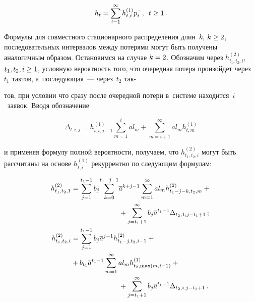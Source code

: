 \begin{multicols}{2}
\noindent
\begin{equation}
\label{loss4}
h_{t}
=\sum\limits_{i=1}^{\infty} h^{(1)}_{t,i} p_i^-, \enskip t \ge 1\,.
\end{equation}

\vspace*{-2pt}

\noindent Формулы для совместного стационарного распределения длин~$k$, 
$k\hm\ge2$, последовательных
интервалов между потерями могут быть получены аналогичным образом. 
Остановимся на случае $k\hm=2$. Обозначим через $h^{(2)}_{t_1,t_2,i}$, 
$t_1,t_2,i \hm\ge 1$, условную вероятность того, что
очередная потеря произойдет через~$t_1$ тактов, а~последующая~--- 
через~$t_2$ так-\linebreak\vspace*{-12pt}

\columnbreak

\noindent
тов, при условии что сразу после очередной потери 
в~сис\-те\-ме находится~$i$~заявок. Вводя обозначение

\vspace*{2pt}

\noindent
$$
\Delta_{t,i,j}=
h^{(1)}_{t,i,j-1} \sum\limits_{m=1}^{i} a l_m 
+\sum\limits_{m=i+1}^{\infty} a l_m
h^{(1)}_{t,m}
$$

\noindent  
и применяя формулу полной вероятности, получаем, что
$h^{(2)}_{t_1,t_2,i}$ могут быть рассчитаны на основе
$h^{(1)}_{t,i}$ рекуррентно по следующим формулам:

\vspace*{-3pt}

\noindent
\begin{align*}
h^{(2)}_{t_1,t_2,1} &=
\sum\limits_{j=1}^{t_1-1}b_j
\!\sum\limits_{k=0}^{t_1-j-1}\!
\overline{a}^{k+j-1}
\sum\limits_{m=1}^{\infty} a l_m
h^{(2)}_{t_1-j-k,t_2,m}+{}\\
&\hspace*{24mm}{}+\sum\limits_{j=t_1+1}^{\infty}
b_j \overline{a}^{t_1-1}
\Delta_{t_2,1,j-t_1+1}\,;\\
h^{(2)}_{t_1,t_2,i} &=
\sum\limits_{j=1}^{t_1-1} b_j
\overline{a}^{j-1} h^{(2)}_{t_1-j,t_2,i-1}+{}\\
&{} + b_{t_1}
\overline{a}^{t_1-1}
\sum\limits_{m=1}^{\infty} a l_m
h^{(1)}_{t_2,\max(m,i-1)}+{}\\
&\hspace*{24mm}{}+ \sum\limits_{j=t_1+1}^{\infty}
b_j \overline{a}^{t_1-1}
\Delta_{t_2,i,j-t_1+1}\,.
\end{align*}


\end{multicols}
